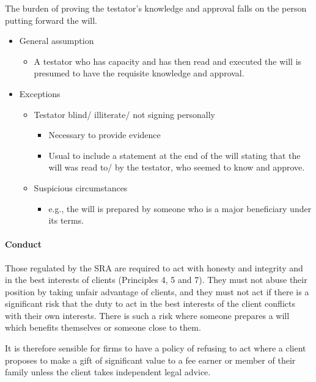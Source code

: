 \documentclass[
]{article}
\newenvironment{Shaded}{}{}
\newcommand{\NormalTok}[1]{#1}
\providecommand{\tightlist}{%
  \setlength{\itemsep}{0pt}\setlength{\parskip}{0pt}}
\begin{document}
The burden of proving the testator's knowledge and approval falls on the
person putting forward the will.

\begin{itemize}
\tightlist
\item
  General assumption

  \begin{itemize}
  \tightlist
  \item
    A testator who has capacity and has then read and executed the will
    is presumed to have the requisite knowledge and approval.
  \end{itemize}
\item
  Exceptions

  \begin{itemize}
  \tightlist
  \item
    Testator blind/ illiterate/ not signing personally

    \begin{itemize}
    \tightlist
    \item
      Necessary to provide evidence
    \item
      Usual to include a statement at the end of the will stating that
      the will was read to/ by the testator, who seemed to know and
      approve.
    \end{itemize}
  \item
    Suspicious circumstances

    \begin{itemize}
    \tightlist
    \item
      e.g., the will is prepared by someone who is a major beneficiary
      under its terms.
    \end{itemize}
  \end{itemize}
\end{itemize}

\hypertarget{conduct}{%
\paragraph{Conduct}\label{conduct}}

\begin{Shaded}
\begin{Highlighting}[]
\NormalTok{Those regulated by the SRA are required to act with honesty and integrity and in the best interests of clients (Principles 4, 5 and 7). They must not abuse their position by taking unfair advantage of clients, and they must not act if there is a significant risk that the duty to act in the best interests of the client conflicts with their own interests. There is such a risk where someone prepares a will which benefits themselves or someone close to them.}

\NormalTok{It is therefore sensible for firms to have a policy of refusing to act where a client proposes to make a gift of significant value to a fee earner or member of their family unless the client takes independent legal advice.}
\end{Highlighting}
\end{Shaded}
\end{document}
